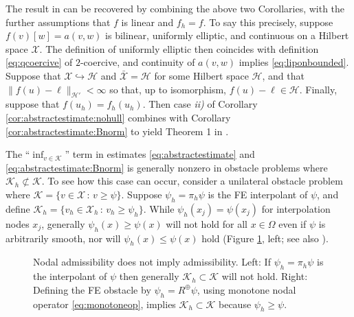 \documentclass[hidelinks,onefignum,onetabnum,final]{siamart220329}  %
\newcommand{\cH}{\mathcal{H}}
\newcommand{\cK}{\mathcal{K}}
\newcommand{\cX}{\mathcal{X}}
\begin{document}
The result in \cite{Falk1974} can be recovered by combining the above two Corollaries, with the further assumptions that $f$ is linear and $f_h=f$.  To say this precisely, suppose $f(v)[w]=a(v,w)$ is bilinear, uniformly elliptic, and continuous on a Hilbert space $\cX$.  The definition of uniformly elliptic then coincides with definition \eqref{eq:qcoercive} of $2$-coercive, and continuity of $a(v,w)$ implies \eqref{eq:liponbounded}.  Suppose that $\cX\hookrightarrow \cH$ and $\bar{\cX} = \cH$ for some Hilbert space $\cH$, and that $\|f(u)-\ell\|_{\cH'} < \infty$ so that, up to isomorphism, $f(u)-\ell \in \cH$.  Finally, suppose that $f(u_h)=f_h(u_h)$.  Then case \emph{ii)} of Corollary \ref{cor:abstractestimate:nohull} combines with Corollary \ref{cor:abstractestimate:Bnorm} to yield Theorem 1 in \cite{Falk1974}.

The ``$\inf_{v\in\cK}$'' term in estimates \eqref{eq:abstractestimate} and \eqref{eq:abstractestimate:Bnorm} is generally nonzero in obstacle problems where $\cK_h \not\subset \cK$.  To see how this case can occur, consider a unilateral obstacle problem where $\cK=\{v \in \cX\,:\,v\ge \psi\}$.  Suppose $\psi_h=\pi_h \psi$ is the FE interpolant of $\psi$, and define $\cK_h=\{v_h \in \cX_h\,:\,v_h\ge \psi_h\}$.  While $\psi_h(x_j)=\psi(x_j)$ for interpolation nodes $x_j$, generally $\psi_h(x) \ge \psi(x)$ will not hold for all $x\in\Omega$ even if $\psi$ is arbitrarily smooth, nor will $\psi_h(x) \le \psi(x)$ hold (Figure \ref{fig:nonadmissible}, left; see also \cite[Figure 5.1.3]{Ciarlet2002}).

\begin{figure}[ht]
\begin{center}
 \quad 
\end{center}
\caption{Nodal admissibility does not imply admissibility.  Left: If $\psi_h=\pi_h\psi$ is the interpolant of $\psi$ then generally $\cK_h\subset\cK$ will not hold.  Right: Defining the FE obstacle by $\psi_h=R^{\oplus} \psi$, using monotone nodal operator \eqref{eq:monotoneop}, implies $\cK_h\subset\cK$ because $\psi_h\ge \psi$.}
\label{fig:nonadmissible}
\end{figure}
\end{document}
